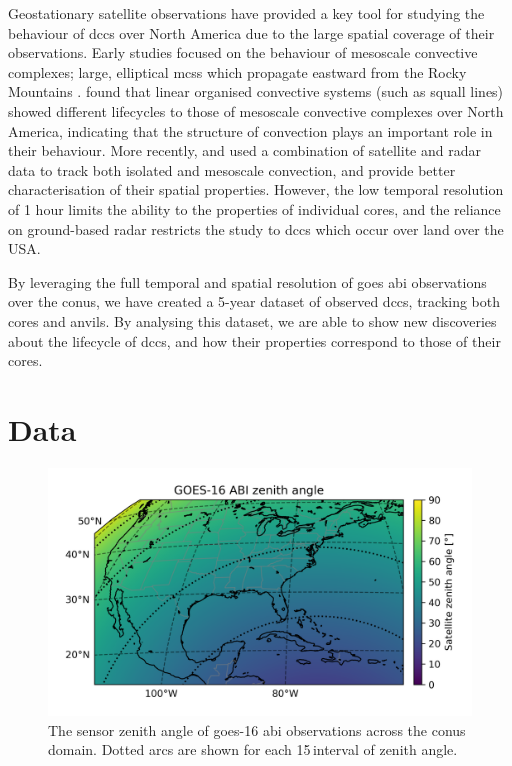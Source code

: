 Geostationary satellite observations have provided a key tool for studying the behaviour of \acrshort{dcc}s over North America due to the large spatial coverage of their observations.
Early studies focused on the behaviour of mesoscale convective complexes; large, elliptical \acrshort{mcs}s which propagate eastward from the Rocky Mountains \citep{maddox_mesoscale_1980, augustine_mesoscale_1988, augustine_mesoscale_1991}.
\citet{tsakraklides_global_2003a} found that linear organised convective systems (such as squall lines) showed different lifecycles to those of mesoscale convective complexes over North America, indicating that the structure of convection plays an important role in their behaviour.
More recently, \citet{feng_spatiotemporal_2019} and \citet{li_high-resolution_2021} used a combination of satellite and radar data to track both isolated and mesoscale convection, and provide better characterisation of their spatial properties.
However, the low temporal resolution of 1 hour limits the ability to the properties of individual cores, and the reliance on ground-based radar restricts the study to \acrshort{dcc}s which occur over land over the USA.

By leveraging the full temporal and spatial resolution of \acrshort{goes} \acrshort{abi} observations over the \acrshort{conus}, we have created a 5-year dataset of observed \acrshort{dcc}s, tracking both cores and anvils.
By analysing this dataset, we are able to show new discoveries about the lifecycle of \acrshort{dcc}s, and how their properties correspond to those of their cores.

\section{Data}

\begin{figure}[tp]
    \centering
    \includegraphics[width=\textwidth]{figures/chapter2_01.png}
    \caption[
    The sensor zenith angle of \acrshort{goes}-16 \acrshort{abi} observations across the \acrshort{conus} domain
    ]{
    The sensor zenith angle of \acrshort{goes}-16 \acrshort{abi} observations across the \acrshort{conus} domain. Dotted arcs are shown for each 15\,\textdegree interval of zenith angle.
    }
    \label{fig:abi_zenith_angles}
\end{figure}

